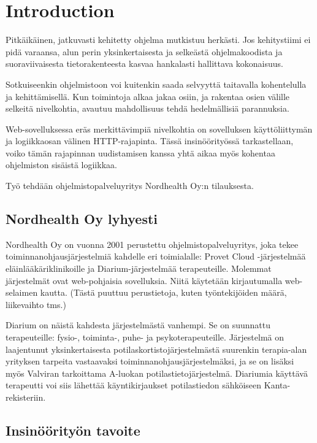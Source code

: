 
\chapter{Introduction}

Pitkäikäinen, jatkuvasti kehitetty ohjelma mutkistuu herkästi. Jos kehitystiimi
ei pidä varaansa, alun perin yksinkertaisesta ja selkeästä ohjelmakoodista ja suoraviivaisesta tietorakenteesta kasvaa hankalasti hallittava kokonaisuus.

Sotkuiseenkin ohjelmistoon voi kuitenkin saada selvyyttä taitavalla kohentelulla
ja kehittämisellä. Kun toimintoja alkaa jakaa osiin, ja rakentaa osien välille
selkeitä nivelkohtia, avautuu mahdollisuus tehdä hedelmällisiä parannuksia.

Web-sovelluksessa eräs merkittävimpiä nivelkohtia on sovelluksen käyttöliittymän
ja logiikkaosan välinen HTTP-rajapinta. Tässä insinöörityössä tarkastellaan,
voiko tämän rajapinnan uudistamisen kanssa yhtä aikaa myös kohentaa ohjelmiston sisäistä logiikkaa.

Työ tehdään ohjelmistopalveluyritys Nordhealth Oy:n tilauksesta.
 
\section{Nordhealth Oy lyhyesti}


Nordhealth Oy on vuonna 2001 perustettu ohjelmistopalveluyritys, joka tekee toiminnanohjausjärjestelmiä kahdelle eri toimialalle: Provet Cloud -järjestelmää eläinlääkäriklinikoille ja Diarium-järjestelmää terapeuteille. Molemmat järjestelmät ovat web-pohjaisia sovelluksia. Niitä käytetään kirjautumalla web-selaimen kautta. (Tästä puuttuu perustietoja, kuten työntekijöiden määrä, liikevaihto tms.)

Diarium on näistä kahdesta järjestelmästä vanhempi. Se on suunnattu terapeuteille: fysio-, toiminta-, puhe- ja psykoterapeuteille. Järjestelmä on laajentunut yksinkertaisesta potilaskortistojärjestelmästä suurenkin terapia-alan yrityksen tarpeita vastaavaksi toiminnanohjausjärjestelmäksi, ja se on lisäksi myös Valviran tarkoittama A-luokan potilastietojärjestelmä. Diariumia käyttävä terapeutti voi siis lähettää käyntikirjaukset potilastiedon sähköiseen Kanta-rekisteriin.

\section{Insinöörityön tavoite}

